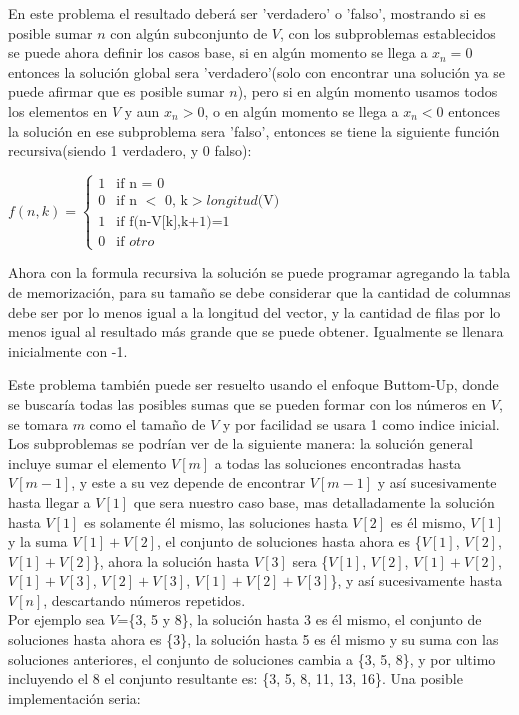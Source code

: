 \documentclass[12pt, a4paper]{article}
\newcommand\cppfile[2][]{

}
\begin{document}
	En este problema el resultado deberá ser 'verdadero' o 'falso', mostrando si es posible sumar $n$ con algún 
	subconjunto de $V$, con los subproblemas establecidos se puede ahora definir los casos base, si en algún momento 
	se llega a $x_{n}=0$ entonces la solución global sera 'verdadero'(solo con encontrar una solución ya se puede 
	afirmar que es posible sumar $n$), pero si en algún momento usamos todos los elementos en $V$ y aun $x_{n}>0$, o 
	en algún momento se llega a $x_{n}<0$ entonces la solución en ese subproblema sera 'falso', entonces se tiene la
	siguiente función recursiva(siendo 1 verdadero, y 0 falso):
	\begin{center}
		$f(n, k) = 	
		\begin{cases}
			1 & \text{if n = 0}\\
			0 & \text{if n $<$ 0, k$>longitud( $V$)$}\\
			1 & \text{if f(n-V[k],k+1)=1}\\
			0 & \text{if $otro$}
		\end{cases}
	$\\
	\end{center}
	Ahora con la formula recursiva la solución se puede programar agregando la tabla de memorización, para su tamaño 
	se debe considerar que la cantidad de columnas debe ser por lo menos igual a la longitud del vector, y la cantidad 
	de filas por lo menos igual al resultado más grande que se puede obtener. Igualmente se llenara inicialmente con -1.
	\cppfile[24-33]{codigos/SubSetSum.cpp}
	
	Este problema también puede ser resuelto usando el enfoque Buttom-Up, donde se buscaría todas las posibles 
	sumas que se pueden formar con los números en $V$, se tomara $m$ como el tamaño de $V$ y por facilidad se usara 1 
	como indice inicial. Los subproblemas se podrían ver de la siguiente manera: la solución general incluye sumar el
	elemento $V[m]$ a todas las soluciones encontradas hasta $V[m-1]$, y este a su vez depende de encontrar $V[m-1]$
	y así sucesivamente hasta llegar a $V[1]$ que sera nuestro caso base, mas detalladamente la solución hasta $V[1]$ 
	es solamente él mismo, las soluciones hasta $V[2]$ es él mismo, $V[1]$ y la suma $V[1]+V[2]$, el conjunto de
	soluciones hasta ahora es \{$V[1]$, $V[2]$, $V[1]+V[2]$\}, ahora la solución hasta $V[3]$ sera 
	\{$V[1]$, $V[2]$, $V[1]+V[2]$, $V[1]+V[3]$, $V[2]+V[3]$, $V[1]+V[2]+V[3]$\}, y así sucesivamente hasta $V[n]$,
	descartando números repetidos.\\
	
	Por ejemplo sea $V$=\{3, 5 y 8\}, la solución hasta 3 es él mismo, el conjunto de soluciones hasta ahora es \{3\},
	la solución hasta 5 es él mismo y su suma con las soluciones anteriores, el conjunto de soluciones cambia a 
	\{3, 5, 8\}, y por ultimo incluyendo el 8 el conjunto resultante es: \{3, 5, 8, 11, 13, 16\}. Una posible
	implementación seria:\\
	\cppfile[8-21]{codigos/SubSetSum.cpp}
	
\end{document}
